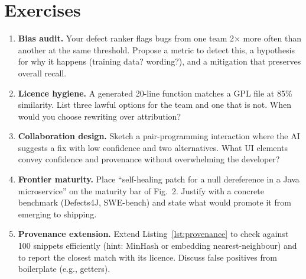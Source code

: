 \section{Exercises}\label{sec:future-ex}
\begin{enumerate}[label=E8.\arabic*, leftmargin=*, itemsep=0.75em]
  \item \textbf{Bias audit.} Your defect ranker flags bugs from one team 2$\times$ more often than another at the same threshold. Propose a metric to detect this, a hypothesis for why it happens (training data? wording?), and a mitigation that preserves overall recall.
  \item \textbf{Licence hygiene.} A generated 20-line function matches a GPL file at 85\% similarity. List three lawful options for the team and one that is not. When would you choose rewriting over attribution?
  \item \textbf{Collaboration design.} Sketch a pair-programming interaction where the AI suggests a fix with low confidence and two alternatives. What UI elements convey confidence and provenance without overwhelming the developer?
  \item \textbf{Frontier maturity.} Place ``self-healing patch for a null dereference in a Java microservice'' on the maturity bar of Fig.~2. Justify with a concrete benchmark (Defects4J, SWE-bench) and state what would promote it from emerging to shipping.
  \item \textbf{Provenance extension.} Extend Listing~\ref{lst:provenance} to check against 100 snippets efficiently (hint: MinHash or embedding nearest-neighbour) and to report the closest match with its licence. Discuss false positives from boilerplate (e.g., getters).
\end{enumerate}
